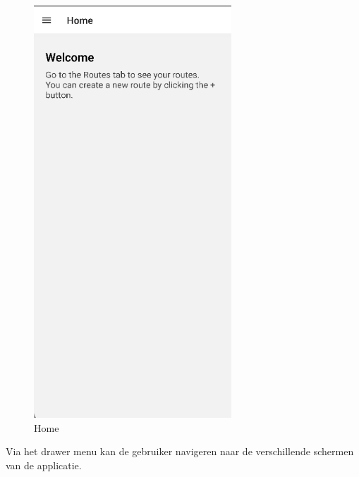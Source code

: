    \begin{figure}[H]
        \includegraphics[width=20em]{./graphics/home.png}
        \centering
        \caption{Home}
        \label{fig:home}
    \end{figure}

    Via het drawer menu kan de gebruiker navigeren naar de verschillende schermen van de applicatie.

